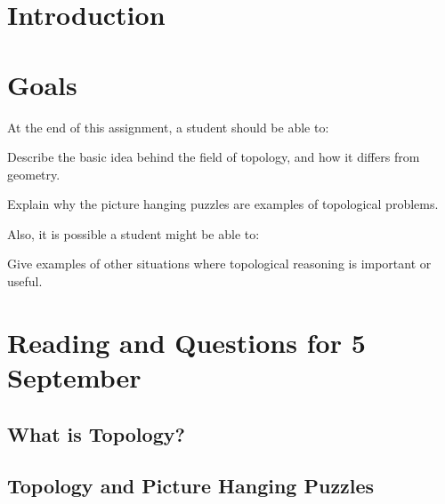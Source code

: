 \documentclass[12pt,letterpaper]{article}
\theoremstyle{definition}
\begin{document}
\setlength{\parskip}{1ex plus 0.5ex minus 0.2ex}
\setlength{\parindent}{0pt}

\pagestyle{fancy}
\cfoot{} 

\section*{Introduction}


\section*{Goals}
At the end of this assignment, a student should be able to:
\begin{compactitem}
\item Describe the basic idea behind the field of topology, and how it differs from geometry.
\item Explain why the picture hanging puzzles are examples of topological problems.
\end{compactitem}
Also, it is possible a student might be able to:
\begin{compactitem}
\item Give examples of other situations where topological reasoning is important or useful.
\end{compactitem}

\section*{Reading and Questions for 5 September}

\subsection*{What is Topology?}


\subsection*{Topology and Picture Hanging Puzzles}




\end{document}
